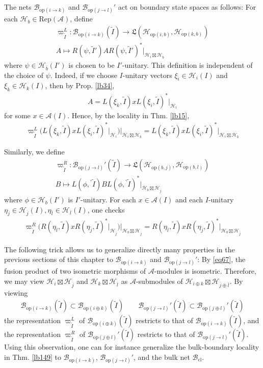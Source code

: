 \documentclass[11pt,b5paper,notitlepage]{article}
\theoremstyle{definition}
\theoremstyle{plain}
\newcommand{\fk}{\mathfrak}
\newcommand{\wtd}{\widetilde}
\newcommand{\ovl}{\overline}
\newcommand{\RepA}{\mathrm{Rep}(\mathcal A)}
\newcommand{\bpr}{{}^\backprime}
\newcommand{\MA}{\mathcal A}
\newcommand{\MH}{\mathcal H}
\newcommand{\Bcl}{\mathcal B_{\mathrm{cl}}}
\newcommand{\Bop}[1]{\mathcal B_{\mathrm{op}({#1})}}
\newcommand{\Hop}[1]{\mathcal H_{\mathrm{op}({#1})}}
\numberwithin{equation}{section}
\begin{document}
The nets $\Bop{i\rightarrow k}$ and $\Bop{j\rightarrow l}'$ act on boundary state spaces as follows: For each $\MH_b\in\RepA$, define
\begin{gather*}
\varpi_{\wtd I}^L:\Bop{i\rightarrow k}(\wtd I)\rightarrow \fk L(\Hop{i,b},\Hop{k,b})\\
A\mapsto R(\psi,\wtd I')AR(\psi,\wtd I')^*|_{\MH_i\boxtimes\MH_{\ovl b}}
\end{gather*}
where $\psi\in\MH_{\ovl b}(I')$ is chosen to be $I'$-unitary. This definition is independent of the choice of $\psi$. Indeed, if we choose $I$-unitary vectors $\xi_i\in\MH_i(I)$ and $\xi_k\in\MH_k(I)$, then by Prop. \ref{lb34},
\begin{align*}
A=L(\xi_k,\wtd I)xL(\xi_i,\wtd I)^*|_{\MH_i}
\end{align*}
for some $x\in\MA(I)$. Hence, by the locality in Thm. \ref{lb15},
\begin{align*}
\varpi_{\wtd I}^L\big(L(\xi_k,\wtd I)xL(\xi_i,\wtd I)^*|_{\MH_i}\big)\Big|_{\MH_i\boxtimes\MH_{\ovl b}}=L(\xi_k,\wtd I)xL(\xi_i,\wtd I)^*\Big|_{\MH_i\boxtimes\MH_{\ovl b}}
\end{align*}

Similarly, we define
\begin{gather*}
\varpi_{\wtd I}^R:\Bop{j\rightarrow l}'(\wtd I)\rightarrow \fk L(\Hop{b,j},\Hop{b,l})\\
B\mapsto L(\phi,\bpr\wtd I)BL(\phi,\bpr\wtd I)^*|_{\MH_b\boxtimes\MH_{\ovl j}}
\end{gather*}
where $\phi\in\MH_b(I')$ is $I'$-unitary. For each $x\in\MA(I)$ and each $I$-unitary $\eta_{\ovl j}\in\MH_{\ovl j}(I),\eta_{\ovl l}\in\MH_{\ovl l}(I)$, one checks
\begin{align*}
\varpi_{\wtd I}^R\big(R(\eta_{\ovl l},\wtd I)xR(\eta_{\ovl j},\wtd I)^*|_{\MH_{\ovl j}}\big)\Big|_{\MH_b\boxtimes\MH_{\ovl j}}=R(\eta_{\ovl l},\wtd I)xR(\eta_{\ovl j},\wtd I)^*\Big|_{\MH_b\boxtimes\MH_{\ovl j}}
\end{align*}


The following trick allows us to generalize directly many properties in the previous sections of this chapter to $\Bop{i\rightarrow k}$ and $\Bop{j\rightarrow l}'$: By \eqref{eq67}, the fusion product of two isometric morphisms of $\MA$-modules is isometric. Therefore, we may view $\MH_i\boxtimes\MH_{\ovl j}$ and $\MH_k\boxtimes\MH_{\ovl l}$ as $\MA$-submodules of $\MH_{i\oplus k}\boxtimes\MH_{\ovl j\oplus \ovl l}$. By viewing
\begin{align*}
\Bop{i\rightarrow k}(\wtd I)\subset \Bop{i\oplus k}(\wtd I)\qquad \Bop{j\rightarrow l}'(\wtd I)\subset \Bop{j\oplus l}'(\wtd I)
\end{align*}
the representation $\varpi^L_{\wtd I}$ of $\Bop{i\oplus k}(\wtd I)$ restricts to that of $\Bop{i\rightarrow k}(\wtd I)$, and the representation $\varpi^R_{\wtd I}$ of $\Bop{j\oplus l}'(\wtd I)$ restricts to that of $\Bop{j\rightarrow l}'(\wtd I)$. Using this observation, one can for instance generalize the bulk-boundary locality in Thm. \ref{lb149} to $\Bop{i\rightarrow k}$, $\Bop{j\rightarrow l}'$, and the bulk net $\Bcl$.
\end{document}
